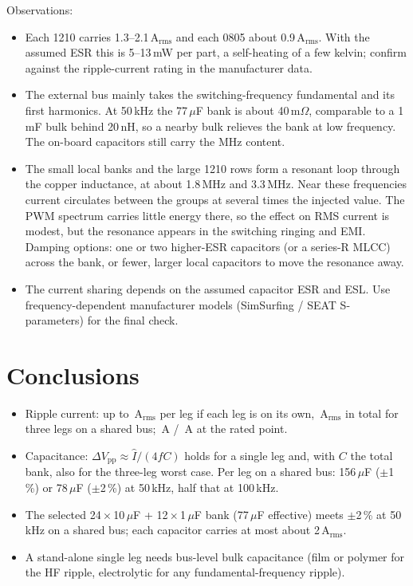 ﻿\documentclass[10pt,a4paper]{article}
\newcommand{\uF}{\ensuremath{\mu}F}
\begin{document}
Observations:
\begin{itemize}\itemsep0pt
\item Each 1210 carries 1.3--2.1\,A$_\mathrm{rms}$ and each 0805 about 0.9\,A$_\mathrm{rms}$. With the assumed ESR this is 5--13\,mW per part, a self-heating of a few kelvin; confirm against the ripple-current rating in the manufacturer data.
\item The external bus mainly takes the switching-frequency fundamental and its first harmonics. At 50\,kHz the 77\,\uF{} bank is about 40\,m$\Omega$, comparable to a 1\,mF bulk behind 20\,nH, so a nearby bulk relieves the bank at low frequency. The on-board capacitors still carry the MHz content.
\item The small local banks and the large 1210 rows form a resonant loop through the copper inductance, at about 1.8\,MHz and 3.3\,MHz. Near these frequencies current circulates between the groups at several times the injected value. The PWM spectrum carries little energy there, so the effect on RMS current is modest, but the resonance appears in the switching ringing and EMI. Damping options: one or two higher-ESR capacitors (or a series-R MLCC) across the bank, or fewer, larger local capacitors to move the resonance away.
\item The current sharing depends on the assumed capacitor ESR and ESL. Use frequency-dependent manufacturer models (SimSurfing / SEAT S-parameters) for the final check.
\end{itemize}

\section{Conclusions}
\begin{itemize}\itemsep0pt
\item Ripple current: up to \IlegWorst\,A$_\mathrm{rms}$ per leg if each leg is on its own, \ItotWorst\,A$_\mathrm{rms}$ in total for three legs on a shared bus; \IlegRated\,A / \ItotRated\,A at the rated point.
\item Capacitance: $\Delta V_\mathrm{pp}\approx\hat I/(4fC)$ holds for a single leg and, with $C$ the total bank, also for the three-leg worst case. Per leg on a shared bus: 156\,\uF{} ($\pm$1\,\%) or 78\,\uF{} ($\pm$2\,\%) at 50\,kHz, half that at 100\,kHz.
\item The selected 24\,$\times$\,10\,\uF{} + 12\,$\times$\,1\,\uF{} bank (77\,\uF{} effective) meets $\pm$2\,\% at 50\,kHz on a shared bus; each capacitor carries at most about 2\,A$_\mathrm{rms}$.
\item A stand-alone single leg needs bus-level bulk capacitance (film or polymer for the HF ripple, electrolytic for any fundamental-frequency ripple).
\end{itemize}
\end{document}
